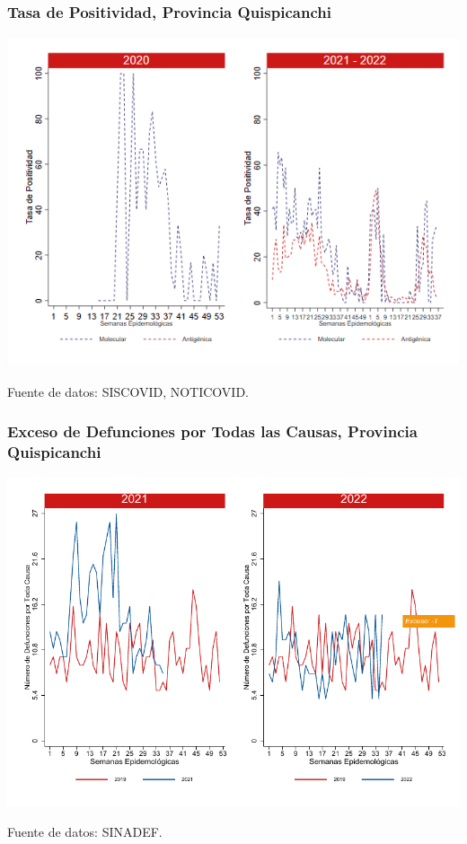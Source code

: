 \documentclass[xcolor=table]{beamer}
\begin{document}
\begin{frame}
	\frametitle{Tasa de Positividad, Provincia Quispicanchi}
	\vspace{-.5cm}
	\begin{center}
		\includegraphics[width=0.8\linewidth, trim={0cm .5cm 0cm 0.2cm},clip]{../figuras/positividad_20_21_12.png}
	\end{center}
	{\tiny Fuente de datos: SISCOVID, NOTICOVID.}
\end{frame}

\begin{frame}
	\frametitle{Exceso de Defunciones por Todas las Causas, Provincia Quispicanchi}
	\vspace{-.5cm}
	\begin{center}
		\includegraphics[width=0.8\linewidth, trim={0cm .5cm 0cm 0.2cm},clip]{../figuras/exceso_12.pdf}
	\end{center}
	{\tiny Fuente de datos: SINADEF.}
	
	\hyperlink{indicadores_provinciales}{}
\end{frame}
\end{document}
